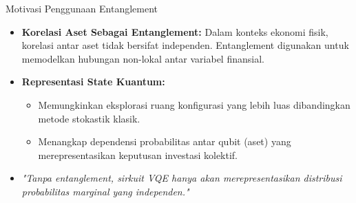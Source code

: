 \begin{frame}{Motivasi Penggunaan Entanglement}
    \begin{itemize}
        \item \textbf{Korelasi Aset Sebagai Entanglement:} Dalam konteks ekonomi fisik, korelasi antar aset tidak bersifat independen. Entanglement digunakan untuk memodelkan hubungan non-lokal antar variabel finansial.
        \item \textbf{Representasi State Kuantum:} 
        \begin{itemize}
            \item Memungkinkan eksplorasi ruang konfigurasi yang lebih luas dibandingkan metode stokastik klasik.
            \item Menangkap dependensi probabilitas antar qubit (aset) yang merepresentasikan keputusan investasi kolektif.
        \end{itemize}
        \item \textit{"Tanpa entanglement, sirkuit VQE hanya akan merepresentasikan distribusi probabilitas marginal yang independen."}
    \end{itemize}
\end{frame}
